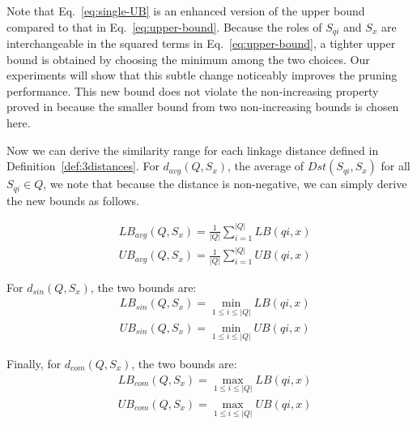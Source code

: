 Note that Eq.~\eqref{eq:single-UB} is an enhanced version of the upper
bound compared to that in Eq.~\eqref{eq:upper-bound}. Because the
roles of $S_{qi}$ and $S_x$ are interchangeable in the squared terms
in Eq.~\eqref{eq:upper-bound}, a tighter upper bound is obtained by
choosing the minimum among the two choices.  Our experiments will show
that this subtle change noticeably improves the pruning
performance. This new bound does not violate the non-increasing
property proved in \cite{Yeh:2008:LLD} because the smaller bound from
two non-increasing bounds is chosen here.

Now we can derive the similarity range for each linkage distance
defined in Definition~\ref{def:3distances}. For $d_{avg}(Q, S_x)$, 
the average of $Dst(S_{qi},S_x)$ for all $S_{qi} \in Q$, we note that because the
distance is non-negative, we can simply derive the new bounds as
follows.

{\small
\begin{align}
&LB_{avg}(Q, S_x)=\frac{1}{|Q|}\sum_{i=1}^{|Q|}LB(qi, x) \label{eq:avg_LB}\\
&UB_{avg}(Q, S_x)=\frac{1}{|Q|}\sum_{i=1}^{|Q|}UB(qi, x) \label{eq:avg_UB}
\end{align}
}

\noindent
For $d_{sin}(Q, S_x)$, the two bounds are:
{\small
\begin{align}
&LB_{sin}(Q, S_x) = \min_{1 \leq i \leq |Q|}LB(qi, x) 
\label{eq:sin_LB}\\
&UB_{sin}(Q, S_x) = \min_{1 \leq i \leq |Q|}UB(qi, x) \label{eq:sin_UB}
\end{align}
}

\noindent
Finally, for $d_{com}(Q, S_x)$, the two bounds are:
{\small
\begin{align}
&LB_{com}(Q, S_x) = \max_{1 \leq i \leq |Q|}LB(qi, x) \label{eq:com_LB}\\
&UB_{com}(Q, S_x) = \max_{1 \leq i \leq |Q|}UB(qi, x) \label{eq:com_UB}
\end{align}
}

